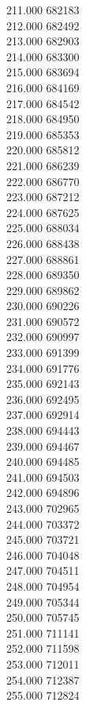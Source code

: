 { 211.000	682183 \\
 212.000	682492 \\
 213.000	682903 \\
 214.000	683300 \\
 215.000	683694 \\
 216.000	684169 \\
 217.000	684542 \\
 218.000	684950 \\
 219.000	685353 \\
 220.000	685812 \\
 221.000	686239 \\
 222.000	686770 \\
 223.000	687212 \\
 224.000	687625 \\
 225.000	688034 \\
 226.000	688438 \\
 227.000	688861 \\
 228.000	689350 \\
 229.000	689862 \\
 230.000	690226 \\
 231.000	690572 \\
 232.000	690997 \\
 233.000	691399 \\
 234.000	691776 \\
 235.000	692143 \\
 236.000	692495 \\
 237.000	692914 \\
 238.000	694443 \\
 239.000	694467 \\
 240.000	694485 \\
 241.000	694503 \\
 242.000	694896 \\
 243.000	702965 \\
 244.000	703372 \\
 245.000	703721 \\
 246.000	704048 \\
 247.000	704511 \\
 248.000	704954 \\
 249.000	705344 \\
 250.000	705745 \\
 251.000	711141 \\
 252.000	711598 \\
 253.000	712011 \\
 254.000	712387 \\
 255.000	712824 \\
}
